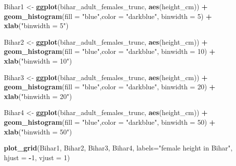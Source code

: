 \documentclass[]{book}
\newenvironment{Shaded}{\begin{snugshade}}{\end{snugshade}}
\newcommand{\KeywordTok}[1]{\textcolor[rgb]{0.13,0.29,0.53}{\textbf{#1}}}
\newcommand{\DataTypeTok}[1]{\textcolor[rgb]{0.13,0.29,0.53}{#1}}
\newcommand{\DecValTok}[1]{\textcolor[rgb]{0.00,0.00,0.81}{#1}}
\newcommand{\StringTok}[1]{\textcolor[rgb]{0.31,0.60,0.02}{#1}}
\newcommand{\OperatorTok}[1]{\textcolor[rgb]{0.81,0.36,0.00}{\textbf{#1}}}
\newcommand{\NormalTok}[1]{#1}
\theoremstyle{definition}
\theoremstyle{definition}
\theoremstyle{definition}
\theoremstyle{remark}
\begin{document}
\begin{Shaded}
\begin{Highlighting}[]
\NormalTok{Bihar1 <-}\StringTok{ }\KeywordTok{ggplot}\NormalTok{(bihar_adult_females_trunc, }\KeywordTok{aes}\NormalTok{(height_cm)) }\OperatorTok{+}\StringTok{ }
\StringTok{  }\KeywordTok{geom_histogram}\NormalTok{(}\DataTypeTok{fill =} \StringTok{"blue"}\NormalTok{,}\DataTypeTok{color =} \StringTok{"darkblue"}\NormalTok{, }\DataTypeTok{binwidth =} \DecValTok{5}\NormalTok{) }\OperatorTok{+}
\StringTok{  }\KeywordTok{xlab}\NormalTok{(}\StringTok{"binwidth = 5"}\NormalTok{)}

\NormalTok{Bihar2 <-}\StringTok{ }\KeywordTok{ggplot}\NormalTok{(bihar_adult_females_trunc, }\KeywordTok{aes}\NormalTok{(height_cm)) }\OperatorTok{+}\StringTok{ }
\StringTok{  }\KeywordTok{geom_histogram}\NormalTok{(}\DataTypeTok{fill =} \StringTok{"blue"}\NormalTok{,}\DataTypeTok{color =} \StringTok{"darkblue"}\NormalTok{, }\DataTypeTok{binwidth =} \DecValTok{10}\NormalTok{) }\OperatorTok{+}
\StringTok{  }\KeywordTok{xlab}\NormalTok{(}\StringTok{"binwidth = 10"}\NormalTok{)}

\NormalTok{Bihar3 <-}\StringTok{ }\KeywordTok{ggplot}\NormalTok{(bihar_adult_females_trunc, }\KeywordTok{aes}\NormalTok{(height_cm)) }\OperatorTok{+}\StringTok{ }
\StringTok{  }\KeywordTok{geom_histogram}\NormalTok{(}\DataTypeTok{fill =} \StringTok{"blue"}\NormalTok{,}\DataTypeTok{color =} \StringTok{"darkblue"}\NormalTok{, }\DataTypeTok{binwidth =} \DecValTok{20}\NormalTok{) }\OperatorTok{+}
\StringTok{  }\KeywordTok{xlab}\NormalTok{(}\StringTok{"binwidth = 20"}\NormalTok{)}

\NormalTok{Bihar4 <-}\StringTok{ }\KeywordTok{ggplot}\NormalTok{(bihar_adult_females_trunc, }\KeywordTok{aes}\NormalTok{(height_cm)) }\OperatorTok{+}\StringTok{ }
\StringTok{  }\KeywordTok{geom_histogram}\NormalTok{(}\DataTypeTok{fill =} \StringTok{"blue"}\NormalTok{,}\DataTypeTok{color =} \StringTok{"darkblue"}\NormalTok{, }\DataTypeTok{binwidth =} \DecValTok{50}\NormalTok{) }\OperatorTok{+}
\StringTok{  }\KeywordTok{xlab}\NormalTok{(}\StringTok{"binwidth = 50"}\NormalTok{)}

\KeywordTok{plot_grid}\NormalTok{(Bihar1, Bihar2, Bihar3, Bihar4, }\DataTypeTok{labels=}\StringTok{"female height in Bihar"}\NormalTok{, }\DataTypeTok{hjust =} \OperatorTok{-}\DecValTok{1}\NormalTok{, }\DataTypeTok{vjust =} \DecValTok{1}\NormalTok{)}
\end{Highlighting}
\end{Shaded}
\end{document}
